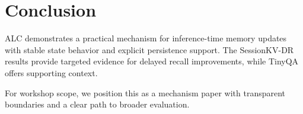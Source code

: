 \section{Conclusion}
ALC demonstrates a practical mechanism for inference-time memory updates with stable state behavior and explicit persistence support. The SessionKV-DR results provide targeted evidence for delayed recall improvements, while TinyQA offers supporting context.

For workshop scope, we position this as a mechanism paper with transparent boundaries and a clear path to broader evaluation.
